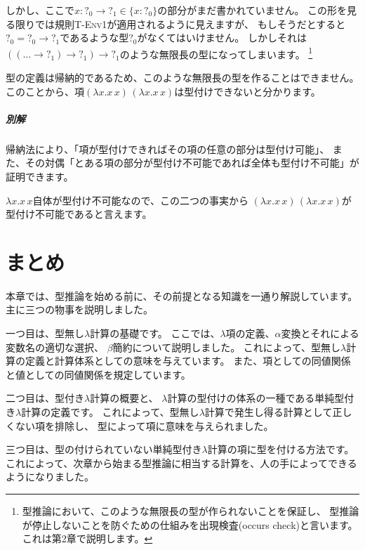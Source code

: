 \begin{exercise}
しかし、ここで$x : ?_0 \to ?_1 \in \{x : ?_0\}$の部分がまだ書かれていません。
この形を見る限りでは規則\textsc{T-Env1}が適用されるように見えますが、
もしそうだとすると$?_0 = ?_0 \to ?_1$であるような型$?_0$がなくてはいけません。
しかしそれは$((\dots \to ?_1) \to ?_1) \to ?_1$のような無限長の型になってしまいます。
\footnote{型推論において、このような無限長の型が作られないことを保証し、
型推論が停止しないことを防ぐための仕組みを出現検査(occurs check)と言います。
これは第2章で説明します。}

型の定義は帰納的であるため、このような無限長の型を作ることはできません。
このことから、項$(\lambda x . x \, x) \, (\lambda x . x \, x)$は型付けできないと分かります。

\subparagraph{別解}

帰納法により、「項が型付けできればその項の任意の部分は型付け可能」、
また、その対偶「とある項の部分が型付け不可能であれば全体も型付け不可能」が証明できます。

$\lambda x . x \, x$自体が型付け不可能なので、この二つの事実から
$(\lambda x . x \, x) \, (\lambda x . x \, x)$が型付け不可能であると言えます。

\end{exercise}

\section{まとめ}

本章では、型推論を始める前に、その前提となる知識を一通り解説しています。主に三つの物事を説明しました。

一つ目は、型無し$\lambda$計算の基礎です。
ここでは、$\lambda$項の定義、$\alpha$変換とそれによる変数名の適切な選択、
$\beta$簡約について説明しました。
これによって、型無し$\lambda$計算の定義と計算体系としての意味を与えています。
また、項としての同値関係と値としての同値関係を規定しています。

二つ目は、型付き$\lambda$計算の概要と、
$\lambda$計算の型付けの体系の一種である単純型付き$\lambda$計算の定義です。
これによって、型無し$\lambda$計算で発生し得る計算として正しくない項を排除し、
型によって項に意味を与えられました。

三つ目は、型の付けられていない単純型付き$\lambda$計算の項に型を付ける方法です。
これによって、次章から始まる型推論に相当する計算を、人の手によってできるようになりました。

